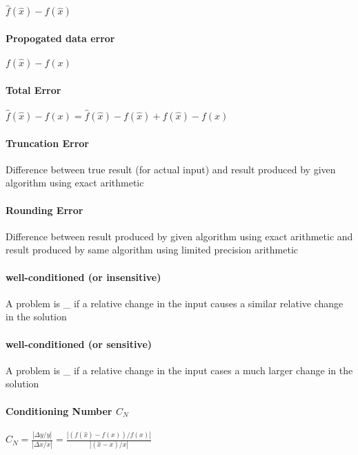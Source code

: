 \documentclass[12pt]{article}
\begin{document}
$\hat{f}(\hat{x}) - f(\hat{x})$

\paragraph{Propogated data error}

$f(\hat{x}) - f(x)$

\paragraph{Total Error}

$\hat{f}(\hat{x}) - f(x) = \hat{f}(\hat{x}) - f(\hat{x}) + f(\hat{x}) - f(x)$

\paragraph{Truncation Error}

Difference between true result (for actual input) and result produced by given algorithm using exact arithmetic

\paragraph{Rounding Error}

Difference between result produced by given algorithm using exact arithmetic and result produced by same algorithm using limited precision arithmetic

\paragraph{well-conditioned (or insensitive)}

A problem is \_ if a relative change in the input causes a similar relative change in the solution

\paragraph{well-conditioned (or sensitive)}

A problem is \_ if a relative change in the input cases a much larger change in the solution

\paragraph{Conditioning Number $C_N$}

$C_N = \frac{|\Delta y/y|}{|\Delta x/x|} = \frac{|(f(\hat{x}) - f(x)) / f(x)|}{|(\hat{x} - x) / x|}$
\end{document}

